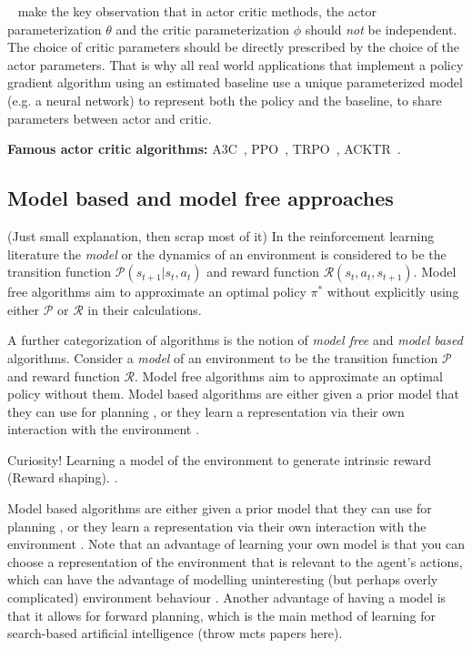 \documentclass{../main.tex}{}
\begin{document}
~\cite{Konda2000} make the key observation that in actor critic methods, the actor parameterization $\theta$ and the critic parameterization $\phi$ should \textit{not} be independent. The choice of critic parameters should be directly prescribed by the choice of the actor parameters. That is why all real world applications that implement a policy gradient algorithm using an estimated baseline use a unique parameterized model (e.g. a neural network) to represent both the policy and the baseline, to share parameters between actor and critic.

\textbf{Famous actor critic algorithms:} A3C~\citep{Mnih2016}, PPO~\citep{Schulman2017}, TRPO~\citep{Schulman2015}, ACKTR~\citep{Wu2017}.

\subsection{Model based and model free approaches}
(Just small explanation, then scrap most of it)
In the reinforcement learning literature the \textit{model} or the dynamics of an environment is considered to be the transition function $\mathcal{P}(s_{t+1} | s_t, a_t)$ and reward function $\mathcal{R}(s_t, a_t, s_{t+1})$. Model free algorithms aim to approximate an optimal policy $\pi^*$ without explicitly using either $\mathcal{P}$ or $\mathcal{R}$ in their calculations.

A further categorization of algorithms is the notion of \textit{model free} and \textit{model based} algorithms. Consider a \textit{model} of an environment to be the transition function $\mathcal{P}$ and reward function $\mathcal{R}$. Model free algorithms aim to approximate an optimal policy without them. Model based algorithms are either given a prior model that they can use for planning \citep{browne2012survey, Soemers2014}, or they learn a representation via their own interaction with the environment \citep{Sutton1991, Guzdial2017}. 

Curiosity! Learning a model of the environment to generate intrinsic reward (Reward shaping). \citep{Pathak2017}.

Model based algorithms are either given a prior model that they can use for planning \citep{browne2012survey, Soemers2014}, or they learn a representation via their own interaction with the environment \citep{Sutton1991, Guzdial2017, Deisenroth2011}. Note that an advantage of learning your own model is that you can choose a representation of the environment that is relevant to the agent's actions, which can have the advantage of modelling uninteresting (but perhaps overly complicated) environment behaviour \citep{Pathak2017}. Another advantage of having a model is that it allows for forward planning, which is the main method of learning for search-based artificial intelligence (throw mcts papers here).
\end{document}
